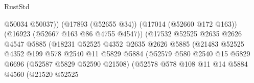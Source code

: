 \begin{lexlean}{RustStd}
\begin{coremodule}
{\begin{coremodule}
{{{{{{{{{{{{{{{{{{{{{{{{{{{{{{{{{{{{{{{{{{{{{{{{{{{{{{{                                                    @50034
                                                    @50037))
                                                (@17893 (@52655 @34))
                                                (@17014 (@52660 @172 @163))
                                                (@16923 (@52667 @163 @86 @4755 @4547))
                                                (@17532
                                                  @52525
                                                  @2635
                                                  @2626
                                                  @4547
                                                  @5885
                                                  (@18231
                                                    @52525
                                                    @4352
                                                    @2635
                                                    @2626
                                                    @5885
                                                    (@21483
                                                      @52525
                                                      @4352
                                                      @199
                                                      @578
                                                      @2540
                                                      @11
                                                      @5829
                                                      @5884
                                                      (@52579
                                                        @580
                                                        @2540
                                                        @15
                                                        @5829
                                                        @6696
                                                        (@52587 @5829 @52590 @21508)
                                                        (@52578
                                                          @578
                                                          @108
                                                          @11
                                                          @14
                                                          @5884
                                                          @4560
                                                          (@21520
                                                            @52525
}}}}}}}}}}}}}}}}}}}}}}}}}}}}}}}}}}}}}}}}}}}}}}}}}}}}}}}
\end{coremodule}}
\end{coremodule}
\end{lexlean}
